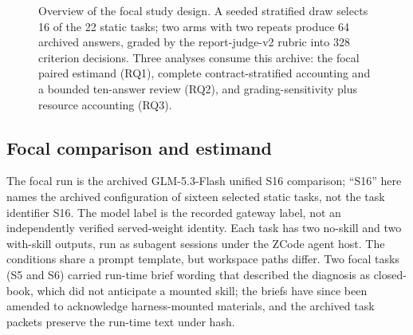 \documentclass[11pt]{article}
\begin{document}
\begin{figure}[H]
\centering
{}
\caption{Overview of the focal study design. A seeded stratified draw selects 16 of the 22 static tasks; two arms with two repeats produce 64 archived answers, graded by the report-judge-v2 rubric into 328 criterion decisions. Three analyses consume this archive: the focal paired estimand (RQ1), complete contract-stratified accounting and a bounded ten-answer review (RQ2), and grading-sensitivity plus resource accounting (RQ3).}
\label{fig:overview}
\end{figure}
\subsection{Focal comparison and estimand}\label{sec:focal-method}
The focal run is the archived GLM-5.3-Flash unified S16 comparison; ``S16'' here names the archived configuration of sixteen selected static tasks, not the task identifier S16. The model label is the recorded gateway label, not an independently verified served-weight identity. Each task has two no-skill and two with-skill outputs, run as subagent sessions under the ZCode agent host. The conditions share a prompt template, but workspace paths differ. Two focal tasks (S5 and S6) carried run-time brief wording that described the diagnosis as closed-book, which did not anticipate a mounted skill; the briefs have since been amended to acknowledge harness-mounted materials, and the archived task packets preserve the run-time text under hash.
\end{document}
